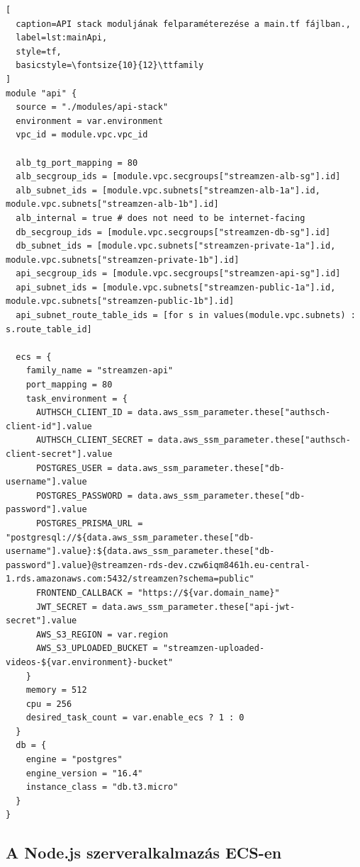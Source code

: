 \begin{minipage}{0.92\textwidth}
\begin{lstlisting}[
  caption=API stack moduljának felparaméterezése a main.tf fájlban.,
  label=lst:mainApi,
  style=tf,
  basicstyle=\fontsize{10}{12}\ttfamily
]
module "api" {
  source = "./modules/api-stack"
  environment = var.environment
  vpc_id = module.vpc.vpc_id

  alb_tg_port_mapping = 80
  alb_secgroup_ids = [module.vpc.secgroups["streamzen-alb-sg"].id]
  alb_subnet_ids = [module.vpc.subnets["streamzen-alb-1a"].id, module.vpc.subnets["streamzen-alb-1b"].id]
  alb_internal = true # does not need to be internet-facing
  db_secgroup_ids = [module.vpc.secgroups["streamzen-db-sg"].id]
  db_subnet_ids = [module.vpc.subnets["streamzen-private-1a"].id, module.vpc.subnets["streamzen-private-1b"].id]
  api_secgroup_ids = [module.vpc.secgroups["streamzen-api-sg"].id]
  api_subnet_ids = [module.vpc.subnets["streamzen-public-1a"].id, module.vpc.subnets["streamzen-public-1b"].id]
  api_subnet_route_table_ids = [for s in values(module.vpc.subnets) : s.route_table_id]

  ecs = {
    family_name = "streamzen-api"
    port_mapping = 80
    task_environment = {
      AUTHSCH_CLIENT_ID = data.aws_ssm_parameter.these["authsch-client-id"].value
      AUTHSCH_CLIENT_SECRET = data.aws_ssm_parameter.these["authsch-client-secret"].value
      POSTGRES_USER = data.aws_ssm_parameter.these["db-username"].value
      POSTGRES_PASSWORD = data.aws_ssm_parameter.these["db-password"].value
      POSTGRES_PRISMA_URL = "postgresql://${data.aws_ssm_parameter.these["db-username"].value}:${data.aws_ssm_parameter.these["db-password"].value}@streamzen-rds-dev.czw6iqm8461h.eu-central-1.rds.amazonaws.com:5432/streamzen?schema=public"
      FRONTEND_CALLBACK = "https://${var.domain_name}"
      JWT_SECRET = data.aws_ssm_parameter.these["api-jwt-secret"].value
      AWS_S3_REGION = var.region
      AWS_S3_UPLOADED_BUCKET = "streamzen-uploaded-videos-${var.environment}-bucket"
    }
    memory = 512
    cpu = 256
    desired_task_count = var.enable_ecs ? 1 : 0
  }
  db = {
    engine = "postgres"
    engine_version = "16.4"
    instance_class = "db.t3.micro"
  }
}
\end{lstlisting}
\end{minipage}

\subsection{A Node.js szerveralkalmazás ECS-en}

